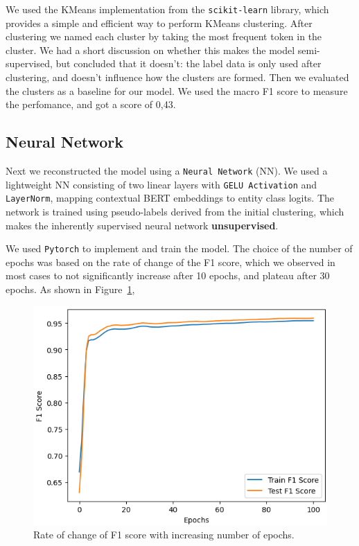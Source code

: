 \documentclass[11pt]{article}
\begin{document}
We used the KMeans implementation from the \texttt{scikit-learn} library, which provides a simple and efficient way to perform KMeans clustering.
After clustering we named each cluster by taking the most frequent token in the cluster. We had a short discussion on whether this makes the model
semi-supervised, but concluded that it doesn't: the label data is only used after clustering, and doesn't influence how the clusters are formed.
Then we evaluated the clusters as a baseline for our model. We used the macro F1 score to measure the perfomance, and got a score of 0,43.

\subsection{Neural Network}

Next we reconstructed the model using a \texttt{Neural Network} (NN). We used a lightweight NN consisting of two linear layers with
\texttt{GELU Activation} and \texttt{LayerNorm}, mapping contextual BERT embeddings to entity class logits. The network is trained using
pseudo-labels derived from the initial clustering, which makes the inherently supervised neural network \textbf{unsupervised}.

We used \texttt{Pytorch} to implement and train the model. The choice of the number of epochs was based on the rate of change of the F1 score,
which we observed in most cases to not significantly increase after 10 epochs, and plateau after 30 epochs. As shown in Figure~\ref{fig:F1-Epochs},

\begin{figure}[H]
  \includegraphics[width=\columnwidth]{F1-Epochs.png}
  \caption{Rate of change of F1 score with increasing number of epochs.}
  \label{fig:F1-Epochs}
\end{figure}
\end{document}
